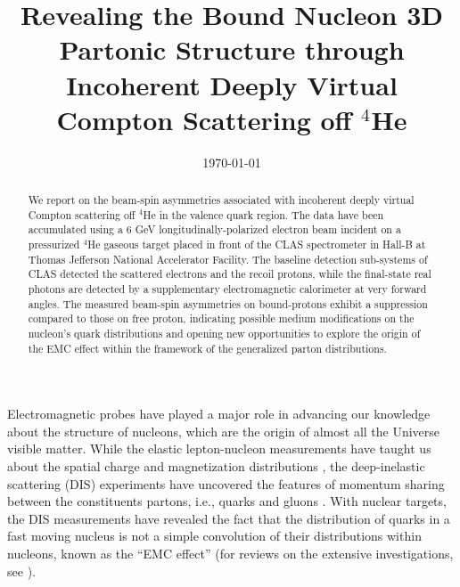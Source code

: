 \documentclass[twocolumn,nofootinbib,showpacs,prl,superscriptaddress,secnumarabic,amssymb,nobibnotes,aps,floatfix]{revtex4}
\begin{document}

\title{Revealing the Bound Nucleon 3D Partonic Structure through Incoherent 
Deeply Virtual Compton Scattering off $^4$He}



%
\date{\today}
\begin{abstract}
We report on the beam-spin asymmetries associated with incoherent deeply 
   virtual Compton scattering off $^4$He in the valence quark region.  The data 
   have been accumulated using a 6 GeV longitudinally-polarized electron beam 
   incident on a pressurized $^4$He gaseous target placed in front of the CLAS 
   spectrometer in Hall-B at Thomas Jefferson National Accelerator Facility.  
   The baseline detection sub-systems of CLAS detected the scattered electrons 
   and the recoil protons, while the final-state real photons are detected by a 
   supplementary electromagnetic calorimeter at very forward angles. The 
   measured beam-spin asymmetries on bound-protons exhibit a suppression 
   compared to those on free proton, indicating possible medium modifications 
   on the nucleon's quark distributions and opening new opportunities to 
   explore the origin of the EMC effect within the framework of the generalized 
   parton distributions.

\end{abstract}

\maketitle 

Electromagnetic probes have played a major role in advancing our knowledge 
about the structure of nucleons, which are the origin of almost all the
Universe visible matter. While the elastic lepton-nucleon measurements have 
taught us about the spatial charge and magnetization distributions 
\cite{Hofstadter:1955ae,Perdrisat:2006hj}, the deep-inelastic scattering (DIS) 
experiments have uncovered the features of momentum sharing between the 
constituents partons, i.e., quarks and gluons \cite{Dokshitzer:1977sg,pdg}. 
With nuclear targets, the DIS measurements have revealed the fact that the 
distribution of quarks in a fast moving nucleus is not a simple convolution of 
their distributions within nucleons, known as the ``EMC 
effect''\cite{EMC_first} (for reviews on the extensive investigations, see  
\cite{EMC_CERN,EMC_SLAC,EMC_HERMES,EMC_JLab,EMC_John,EMC_mdeium_1,EMC_medium_2}).
\end{document}
